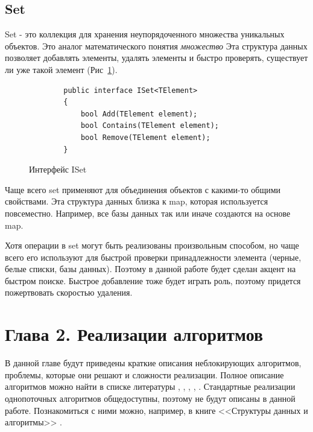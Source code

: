 \documentclass[12pt]{article}
\begin{document}
{			\subsection{Set}
				\par Set - это коллекция для хранения неупорядоченного множества уникальных объектов. Это аналог математического понятия \textit{множество} Эта структура данных позволяет добавлять элементы, удалять элементы и быстро проверять, существует ли уже такой элемент (Рис~\ref{pic:Set}). 
				\begin{figure}[h]
					\begin{lstlisting}
		public interface ISet<TElement>
		{
			bool Add(TElement element);
			bool Contains(TElement element);
			bool Remove(TElement element);
		}
					\end{lstlisting}
					\caption{Интерфейс ISet}
					\label{pic:Set}
				\end{figure}
				\par Чаще всего set применяют для объединения объектов с какими-то общими свойствами. Эта структура данных близка к map, которая используется повсеместно. Например, все базы данных так или иначе создаются на основе map.  
				\par Хотя операции в set могут быть реализованы произвольным способом, но чаще всего его используют для быстрой проверки принадлежности элемента (черные, белые списки, базы данных). Поэтому в данной работе будет сделан акцент на быстром поиске. Быстрое добавление тоже будет играть роль, поэтому придется пожертвовать скоростью удаления.
		\newpage
		
		\section{Глава 2. Реализации алгоритмов}
			\par В данной главе будут приведены краткие описания неблокирующих алгоритмов, проблемы, которые они решают и сложности реализации. Полное описание алгоритмов можно найти в списке литературы \cite{LinkedList}, \cite{ListSkipList}, \cite{ListAndSkipList}, \cite{HashTable}, \cite{artOfMultiprocessor}. Стандартные реализации однопоточных алгоритмов общедоступны, поэтому не будут описаны в данной работе. Познакомиться с ними можно, например, в книге <<Структуры данных и алгоритмы>> \cite{dataStructures}.
}
\end{document}
